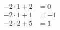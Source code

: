 \documentclass[preview]{standalone}
\begin{document}
\begin{align*}
- 2\cdot1 + 2 & = 0 \\ - 2\cdot1 + 1 & = -1 \\ - 2\cdot2 + 5 & = 1
\end{align*}
\end{document}
